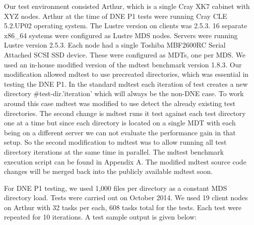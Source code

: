 \documentclass[conference,compsoc]{IEEEtran}
\begin{document}
Our test environment consisted Arthur, which is a single Cray XK7 cabinet with
XYZ nodes. Arthur at the time of DNE P1 tests were running Cray CLE 5.2.UP02
operating system. The Lustre version on clients was 2.5.3. 16 separate x86_64
systems were configured as Lustre MDS nodes. Servers were running Lustre
version 2.5.3. Each node had a single Toshiba MBF2600RC Serial Attached SCSI
SSD device. These were configured as MDTs, one per MDS.  We used an in-house
modified version of the mdtest benchmark version 1.8.3. Our modification
allowed mdtest to use precreated directories, which was essential in testing
the DNE P1. In the standard mdtest each iteration of test creates a new
directory #test-dir.’iteration’ which will always be the non-DNE case. To work
around this case mdtest was modified to use detect the already existing test
directories. The second change is mdtest runs it test against each test
directory one at  a time but since each directory is located on a single MDT
with each being on a different server we can not evaluate the performance gain
in that setup. So the second modification to mdtest was to allow running all
test directory iterations at the same time in parallel. The mdtest benchmark
execution script can be found in Appendix A. The modified mdtest source code
changes will be merged back into the publicly available mdtest soon.


For DNE P1 testing, we used 1,000 files per directory as a constant MDS
directory load. Tests were carried out on October 2014. We used 19 client nodes
on Arthur with 32 tasks per each, 608 tasks total for the tests. Each test were
repeated for 10 iterations. A test sample output is given below:
\end{document}
